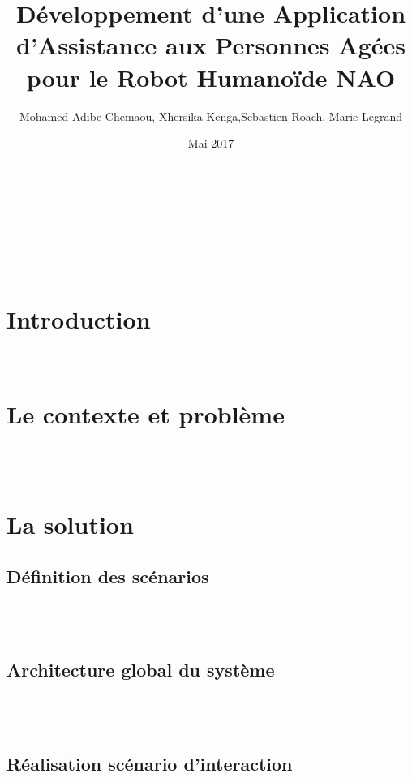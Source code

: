 \documentclass[a4paper,11pt]{article}
\title{ Développement d’une Application d’Assistance aux Personnes Agées pour le Robot Humanoïde NAO }
\author{ Mohamed Adibe Chemaou, Xhersika Kenga,Sebastien Roach, Marie Legrand}
\date{ Mai 2017 }
\begin{document}
\maketitle   %


   ~\\
   ~\\


\renewcommand{\contentsname}{Sommaire } %
\tableofcontents
\newpage





~\\
~\\
\section{ Introduction }


	
	   
~\\
\section{Le contexte et problème }



   
     
~\\
~\\
\section{La solution }



	\subsection{Définition des scénarios }
	
	
	~\\
	~\\	
	\subsection{Architecture global du système }
	
	
		   
	~\\
	~\\	
	\subsection{ Réalisation scénario d’interaction }
	
\end{document}
